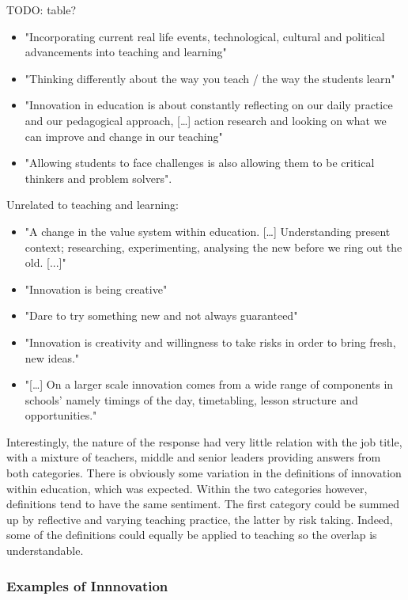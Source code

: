 TODO: table?

\begin{itemize}
\item "Incorporating current real life events, technological, cultural and political advancements into teaching and learning"
\item "Thinking differently about the way you teach / the way the students learn"
\item "Innovation in education is about constantly reflecting on our daily practice and our pedagogical approach, […] action research and looking on what we can improve and change in our teaching"
\item "Allowing students to face challenges is also allowing them to be critical thinkers and problem solvers".
\end{itemize}

Unrelated to teaching and learning:
\begin{itemize}
\item "A change in the value system within education. […] Understanding present context; researching, experimenting, analysing the new before we ring out the old. [...]"
\item "Innovation is being creative"
\item "Dare to try something new and not always guaranteed"
\item "Innovation is creativity and willingness to take risks in order to bring fresh, new ideas."
\item "[…] On a larger scale innovation comes from a wide range of components in schools' namely timings of the day, timetabling, lesson structure and opportunities."
\end{itemize}

Interestingly, the nature of the response had very little relation with the job title, with a mixture of teachers, middle and senior leaders providing answers from both categories. There is obviously some variation in the definitions of innovation within education, which was expected. Within the two categories however, definitions tend to have the same sentiment. The first category could be summed up by reflective and varying teaching practice, the latter by risk taking. Indeed, some of the definitions could equally be applied to teaching so the overlap is understandable.

\subsubsection{Examples of Innnovation}

